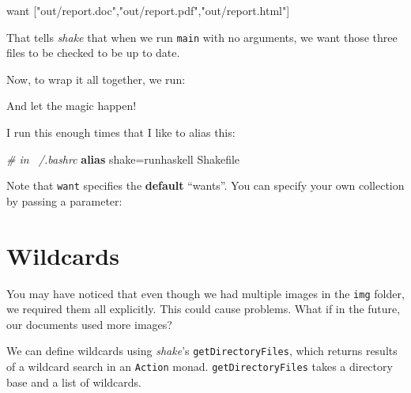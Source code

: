 \documentclass[]{article}
\newenvironment{Shaded}{}{}
\newcommand{\KeywordTok}[1]{\textcolor[rgb]{0.00,0.44,0.13}{\textbf{{#1}}}}
\newcommand{\StringTok}[1]{\textcolor[rgb]{0.25,0.44,0.63}{{#1}}}
\newcommand{\CommentTok}[1]{\textcolor[rgb]{0.38,0.63,0.69}{\textit{{#1}}}}
\newcommand{\NormalTok}[1]{{#1}}
\begin{document}
\begin{Shaded}
\begin{Highlighting}[]
\NormalTok{want [}\StringTok{"out/report.doc"}\NormalTok{,}\StringTok{"out/report.pdf"}\NormalTok{,}\StringTok{"out/report.html"}\NormalTok{]}
\end{Highlighting}
\end{Shaded}

That tells \emph{shake} that when we run \texttt{main} with no
arguments, we want those three files to be checked to be up to date.

Now, to wrap it all together, we run:

\begin{Shaded}
\end{Shaded}

And let the magic happen!

I run this enough times that I like to alias this:

\begin{Shaded}
\begin{Highlighting}[]
\CommentTok{# in ~/.bashrc}
\KeywordTok{alias} \NormalTok{shake=runhaskell Shakefile}
\end{Highlighting}
\end{Shaded}

Note that \texttt{want} specifies the \textbf{default} ``wants''. You
can specify your own collection by passing a parameter:

\begin{Shaded}
\end{Shaded}

\section{Wildcards}\label{wildcards}

You may have noticed that even though we had multiple images in the
\texttt{img} folder, we required them all explicitly. This could cause
problems. What if in the future, our documents used more images?

We can define wildcards using \emph{shake}'s \texttt{getDirectoryFiles},
which returns results of a wildcard search in an \texttt{Action} monad.
\texttt{getDirectoryFiles} takes a directory base and a list of
wildcards.
\end{document}
